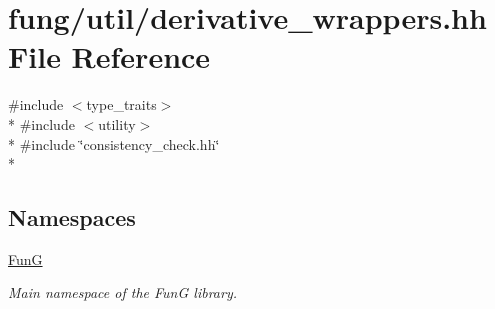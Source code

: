 \hypertarget{derivative__wrappers_8hh}{}\section{fung/util/derivative\+\_\+wrappers.hh File Reference}
\label{derivative__wrappers_8hh}
{\ttfamily \#include $<$type\+\_\+traits$>$}\\*
{\ttfamily \#include $<$utility$>$}\\*
{\ttfamily \#include \char`\"{}consistency\+\_\+check.\+hh\char`\"{}}\\*
\subsection*{Namespaces}
\begin{DoxyCompactItemize}
\item 
 \hyperlink{namespaceFunG}{Fun\+G}
\begin{DoxyCompactList}\small\item\em Main namespace of the Fun\+G library. \end{DoxyCompactList}\end{DoxyCompactItemize}
